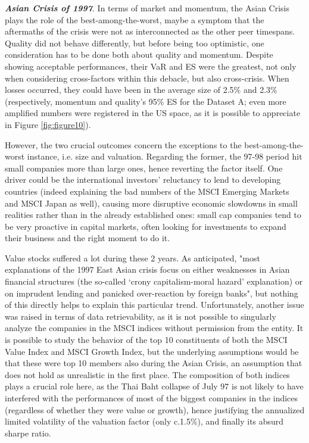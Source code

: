 \documentclass[12pt]{article}
\begin{document}
\textit{\textbf{Asian Crisis of 1997}}. In terms of market and momentum, the Asian Crisis plays the role of the best-among-the-worst, maybe a symptom that the aftermaths of the crisis were not as interconnected as the other peer timespans. Quality did not behave differently, but before being too optimistic, one consideration has to be done both about quality and momentum. Despite showing acceptable performances, their VaR and ES were the greatest, not only when considering cross-factors within this debacle, but also cross-crisis. When losses occurred, they could have been in the average size of 2.5\% and 2.3\% (respectively, momentum and quality's 95\% ES for the Dataset A; even more amplified numbers were registered in the US space, as it is possible to appreciate in Figure \ref{fig:figure10}).

However, the two crucial outcomes concern the exceptions to the best-among-the-worst instance, i.e. size and valuation. Regarding the former, the 97-98 period hit small companies more than large ones, hence reverting the factor itself. One driver could be the international investors' reluctancy to lend to developing countries (indeed explaining the bad numbers of the MSCI Emerging Markets and MSCI Japan as well), causing more disruptive economic slowdowns in small realities rather than in the already established ones: small cap companies tend to be very proactive in capital markets, often looking for investments to expand their business and the right moment to do it. 

Value stocks suffered a lot during these 2 years. As anticipated, "most explanations of the 1997 East Asian crisis focus on either weaknesses in Asian financial structures (the so-called ‘crony capitalism-moral hazard’ explanation) or on imprudent lending and panicked over-reaction by foreign banks"\cite{democratizing_governance}, but nothing of this directly helps to explain this particular trend. Unfortunately, another issue was raised in terms of data retrievability, as it is not possible to singularly analyze the companies in the MSCI indices without permission from the entity. It is possible to study the behavior of the top 10 constituents of both the MSCI Value Index and MSCI Growth Index, but the underlying assumptions would be that these were top 10 members also during the Asian Crisis, an assumption that does not hold as unrealistic in the first place.
The composition of both indices plays a crucial role here, as the Thai Baht collapse of July 97 is not likely to have interfered with the performances of most of the biggest companies in the indices (regardless of whether they were value or growth), hence justifying the annualized limited volatility of the valuation factor (only c.1.5\%), and finally its absurd sharpe ratio.
\end{document}
